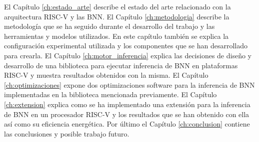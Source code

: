 El Capítulo \ref{ch:estado_arte} describe el estado del arte relacionado con la arquitectura RISC-V y las BNN. El Capítulo \ref{ch:metodologia} describe la metodología que se ha seguido durante el desarrollo del trabajo y las herramientas y modelos utilizados. En este capítulo también se explica la configuración experimental utilizada y los componentes que se han desarrollado para crearla. El Capítulo \ref{ch:motor_inferencia} explica las decisiones de diseño y desarrollo de una biblioteca para ejecutar inferencia de BNN en plataformas RISC-V y muestra resultados obtenidos con la misma. El Capítulo \ref{ch:optimizaciones} expone dos optimizaciones software para la inferencia de BNN implementadas en la biblioteca mencionada previamente. El Capítulo \ref{ch:extension} explica como se ha implementado una extensión para la inferencia de BNN en un procesador RISC-V y los resultados que se han obtenido con ella así como su eficiencia energética. Por último el Capítulo \ref{ch:conclusion} contiene las conclusiones y posible trabajo futuro.
